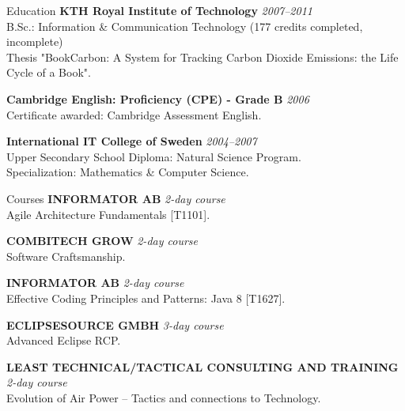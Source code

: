 \documentclass{resume}
\begin{document}
  \begin{rSection}{Education}
  {\bf KTH Royal Institute of Technology}
    \hfill {\em 2007--2011 } \\
    { B.Sc.: Information \& Communication Technology (177 credits completed, incomplete) } \\
    { Thesis "BookCarbon: A System for Tracking Carbon Dioxide Emissions: the Life Cycle of a Book". }

    {\bf Cambridge English: Proficiency (CPE) - Grade B}
    \hfill {\em 2006 } \\
    { Certificate awarded: Cambridge Assessment English. }

    {\bf International IT College of Sweden}
    \hfill {\em 2004--2007 } \\
    { Upper Secondary School Diploma: Natural Science Program. } \\
    { Specialization: Mathematics \& Computer Science. }
  \end{rSection}

  \begin{rSection}{Courses}
  {\bf INFORMATOR AB}
    \hfill {\em 2-day course } \\
    { Agile Architecture Fundamentals [T1101]. }

    {\bf COMBITECH GROW}
    \hfill {\em 2-day course } \\
    { Software Craftsmanship. }

    {\bf INFORMATOR AB}
    \hfill {\em 2-day course } \\
    { Effective Coding Principles and Patterns: Java 8 [T1627]. }

    {\bf ECLIPSESOURCE GMBH}
    \hfill {\em 3-day course } \\
    { Advanced Eclipse RCP. }

    {\bf LEAST TECHNICAL/TACTICAL CONSULTING AND TRAINING}
    \hfill {\em 2-day course } \\
    { Evolution of Air Power – Tactics and connections to Technology. }
  \end{rSection}
\end{document}
